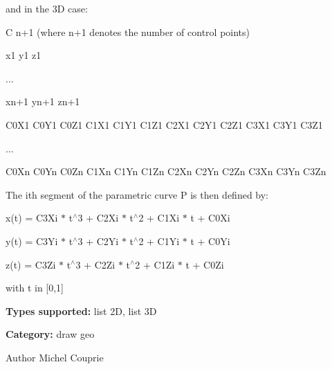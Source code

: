 and in the 3D case:

C n+1 (where n+1 denotes the number of control points)\par
 x1 y1 z1\par
 ...\par
 xn+1 yn+1 zn+1\par
 C0X1 C0Y1 C0Z1 C1X1 C1Y1 C1Z1 C2X1 C2Y1 C2Z1 C3X1 C3Y1 C3Z1\par
 ...\par
 C0Xn C0Yn C0Zn C1Xn C1Yn C1Zn C2Xn C2Yn C2Zn C3Xn C3Yn C3Zn\par


The ith segment of the parametric curve P is then defined by:

x(t) = C3Xi $\ast$ t$^\wedge$3 + C2Xi $\ast$ t$^\wedge$2 + C1Xi $\ast$ t + C0Xi\par
 y(t) = C3Yi $\ast$ t$^\wedge$3 + C2Yi $\ast$ t$^\wedge$2 + C1Yi $\ast$ t + C0Yi\par
 z(t) = C3Zi $\ast$ t$^\wedge$3 + C2Zi $\ast$ t$^\wedge$2 + C1Zi $\ast$ t + C0Zi\par
 with t in [0,1]

{\bfseries Types supported:} list 2D, list 3D

{\bfseries Category:} draw geo

\begin{DoxyAuthor}{Author}
Michel Couprie 
\end{DoxyAuthor}
